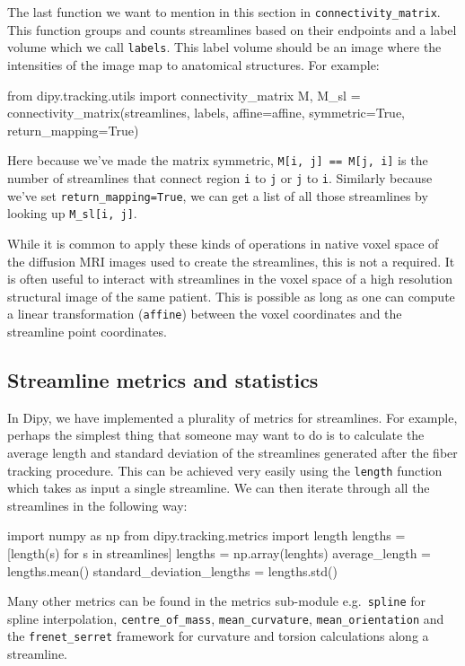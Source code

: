 \documentclass{bioinfo}
\begin{document}
The last function we want to mention in this section in
\texttt{connectivity\_matrix}. This function groups and counts streamlines
based on their endpoints and a label volume which we call \texttt{labels}. This
label volume should be an image where the intensities of the image map to
anatomical structures. For example:

\begin{python}
from dipy.tracking.utils import
                              connectivity_matrix
M, M_sl = connectivity_matrix(streamlines, labels,
                              affine=affine,
                              symmetric=True,
                              return_mapping=True)
\end{python}

Here because we've made the matrix symmetric, \texttt{M[i, j] == M[j, i]} is the number of streamlines that connect region \texttt{i} to \texttt{j}
or \texttt{j} to \texttt{i}. Similarly because we've set
\texttt{return\_mapping=True}, we can get a list of all those streamlines by
looking up \texttt{M\_sl[i, j]}.

While it is common to apply these kinds of operations in native voxel space of
the diffusion MRI images used to create the streamlines, this is not a
required. It is often useful to interact with streamlines in the voxel space of
a high resolution structural image of the same patient. This is possible as
long as one can compute a linear transformation (\texttt{affine}) between the voxel coordinates and the streamline point coordinates.

\subsection{Streamline metrics and statistics}

In Dipy, we have implemented a plurality of metrics for streamlines. For example,
perhaps the simplest thing that someone may want to do is to calculate the
average length and standard deviation of the streamlines generated after the
fiber tracking procedure. This can be achieved very easily using the \texttt{length}
function which takes as input a single streamline. We can then iterate through
all the streamlines in the following way:
\begin{python}
import numpy as np
from dipy.tracking.metrics import length
lengths = [length(s) for s in streamlines]
lengths = np.array(lenghts)
average_length = lengths.mean()
standard_deviation_lengths = lengths.std()
\end{python}
Many other metrics can be found in the metrics sub-module e.g.~\texttt{spline} for
spline interpolation, \texttt{centre\_of\_mass}, \texttt{mean\_curvature},
\texttt{mean\_orientation} and the \texttt{frenet\_serret} framework for curvature
and torsion calculations along a streamline.
\end{document}
